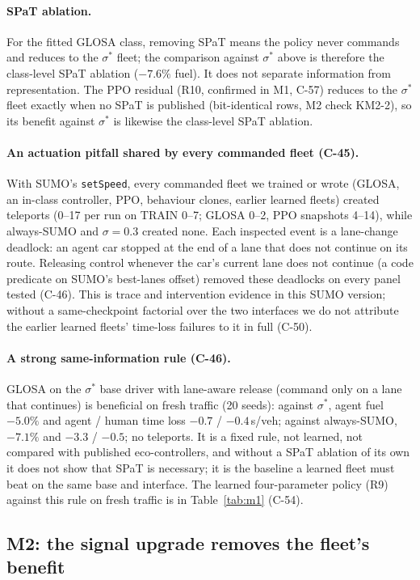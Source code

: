 \documentclass[11pt]{article}
\begin{document}
\paragraph{SPaT ablation.} For the fitted GLOSA class, removing SPaT means the policy never commands and reduces to the
$\sigma^*$ fleet; the comparison against $\sigma^*$ above is therefore the class-level SPaT ablation ($-7.6\%$ fuel). It does not separate
information from representation. The PPO residual (R10, confirmed in M1, C-57) reduces to the $\sigma^*$ fleet exactly when no SPaT is
published (bit-identical rows, M2 check KM2-2), so its benefit against $\sigma^*$ is likewise the class-level SPaT ablation.
\paragraph{An actuation pitfall shared by every commanded fleet (C-45).} With SUMO's \texttt{setSpeed}, every commanded fleet we
trained or wrote (GLOSA, an in-class controller, PPO, behaviour clones, earlier learned fleets) created teleports (0--17 per run on TRAIN 0--7;
GLOSA 0--2, PPO snapshots 4--14), while always-SUMO and $\sigma=0.3$ created none. Each inspected event is a lane-change deadlock: an agent car stopped at the end of a lane that does
not continue on its route. Releasing control whenever the car's current lane does not continue (a code predicate on SUMO's best-lanes
offset) removed these deadlocks on every panel tested (C-46). This is trace and intervention evidence in this SUMO version; without a
same-checkpoint factorial over the two interfaces we do not attribute the earlier learned fleets' time-loss failures to it in full (C-50).
\paragraph{A strong same-information rule (C-46).} GLOSA on the $\sigma^*$ base driver with lane-aware release (command only on a lane
that continues) is beneficial on fresh traffic (20 seeds): against $\sigma^*$, agent fuel $-5.0\%$ and agent / human time loss $-0.7$ /
$-0.4$\,s/veh; against always-SUMO, $-7.1\%$ and $-3.3$ / $-0.5$; no teleports. It is a fixed rule, not learned, not compared with
published eco-controllers, and without a SPaT ablation of its own it does not show that SPaT is necessary; it is the baseline a learned
fleet must beat on the same base and interface.
The learned four-parameter policy (R9) against this rule on fresh traffic is in Table~\ref{tab:m1} (C-54).

\subsection{M2: the signal upgrade removes the fleet's benefit}\label{sec:m2}
\end{document}

